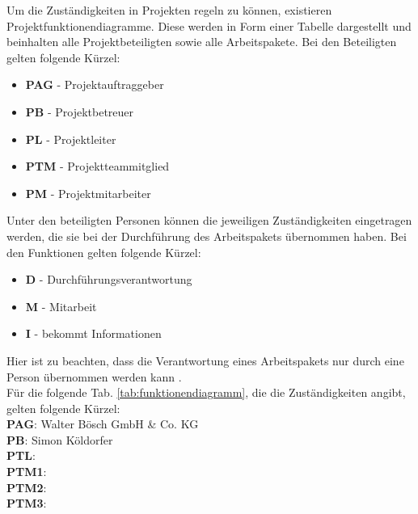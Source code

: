 Um die Zuständigkeiten in Projekten regeln zu können, existieren Projektfunktionendiagramme. Diese werden in Form einer Tabelle dargestellt und beinhalten alle Projektbeteiligten sowie alle Arbeitspakete. Bei den Beteiligten gelten folgende Kürzel:
\begin{itemize}
	\item \textbf{PAG} - Projektauftraggeber
        \item \textbf{PB} - Projektbetreuer
	\item \textbf{PL} - Projektleiter
	\item \textbf{PTM} - Projektteammitglied
	\item \textbf{PM} - Projektmitarbeiter
\end{itemize}
Unter den beteiligten Personen können die jeweiligen Zuständigkeiten eingetragen werden, die sie bei der Durchführung des Arbeitspakets übernommen haben.
Bei den Funktionen gelten folgende Kürzel:
\begin{itemize}
	\item \textbf{D} - Durchführungsverantwortung
	\item \textbf{M} - Mitarbeit
	\item \textbf{I} - bekommt Informationen
\end{itemize}
Hier ist zu beachten, dass die Verantwortung eines Arbeitspakets nur durch eine Person übernommen werden kann \cite[vgl.][]{prezi:o.J.}. \\
Für die folgende Tab. \ref{tab:funktionendiagramm}, die die Zuständigkeiten angibt, gelten folgende Kürzel: \\ 
\textbf{PAG}: Walter Bösch GmbH \& Co. KG \\\textbf{PB}: Simon Köldorfer \\\textbf{PTL}: \mangeng \\\textbf{PTM1}: \pezze \\\textbf{PTM2}: \fenkart \\\textbf{PTM3}: \schneider

